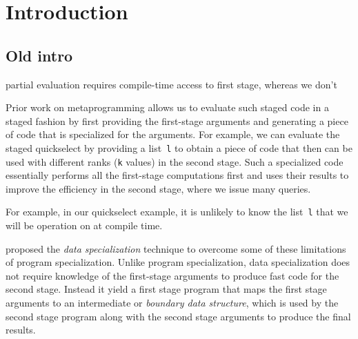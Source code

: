 \section{Introduction}


\subsection{Old intro}

partial evaluation requires compile-time access to first stage, whereas we don't

Prior work on metaprogramming allows us to evaluate such staged code
in a staged fashion by first providing the first-stage arguments and
generating a piece of code that is specialized for the arguments.  For
example, we can evaluate the staged quickselect by providing a
list~\texttt{l} to obtain a piece of code that then can be used with
different ranks (\texttt{k} values) in the second stage.
Such a specialized code essentially performs all the first-stage computations
first and uses their results to improve the efficiency in the second stage,
where we issue many queries.  

For example, in our quickselect example, it is unlikely to know the
list~\texttt{l} that we will be operation on at compile time. 

\cite{knoblock96} proposed the {\em data specialization}
technique to overcome some of these limitations of program
specialization.  
Unlike program specialization,
data specialization does not require knowledge of the first-stage
arguments to produce fast code for the second stage.  
Instead it yield
a first stage program that maps the first stage arguments to an
intermediate or {\em boundary data structure}, which is used by the
second stage program along with the second stage arguments to produce
the final results.  

